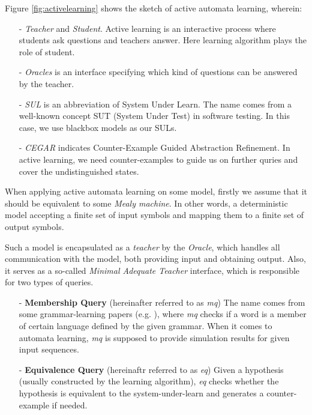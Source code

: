 \documentclass[conference, a4paper]{IEEEtran}
\begin{document}
Figure \ref{fig:activelearning} shows the sketch of active automata learning, wherein:
\begin{itemize}
  \item[-] \emph{Teacher} and \emph{Student}. Active learning is an interactive process where
    students ask questions and teachers answer. Here learning algorithm plays the role of student.
  \item[-] \emph{Oracles} is an interface specifying which kind of questions can be answered by the
    teacher.
  \item[-] \emph{SUL} is an abbreviation of System Under Learn. The name comes from a well-known
    concept SUT (System Under Test) in software testing. In this case, we use blackbox models as our
    SULs.
  \item[-] \emph{CEGAR} indicates Counter-Example Guided Abstraction
    Refinement\cite{DBLP:conf/cav/ClarkeGJLV00}. In active learning, we need counter-examples to
    guide us on further quries and cover the undistinguished states.
\end{itemize}

When applying active automata learning on some model, firstly we assume that it should be equivalent
to some \emph{Mealy machine}. In other words, a deterministic model accepting a finite set of input
symbols and mapping them to a finite set of output symbols.

Such a model is encapsulated as a \emph{teacher} by the \emph{Oracle}, which handles
all communication with the model, both providing input and obtaining output. Also, it serves as a
so-called \emph{Minimal Adequate Teacher} interface, which is responsible for two types of
queries. 

\begin{itemize}
  \item[-] \textbf{Membership Query} (hereinafter referred to as \emph{mq}) The name comes from
    some grammar-learning papers (e.g. \cite{DBLP:journals/iandc/Angluin87}), where \emph{mq} checks
    if a word is a member of certain language defined by the given grammar. When it comes to
    automata learning, \emph{mq} is supposed to provide simulation results for given input
    sequences.
  \item[-] \textbf{Equivalence Query} (hereinaftr referred to as \emph{eq}) Given a hypothesis
    (usually constructed by the learning algorithm), \emph{eq} checks whether the hypothesis is
    equivalent to the system-under-learn and generates a counter-example if needed.
\end{itemize}
\end{document}
